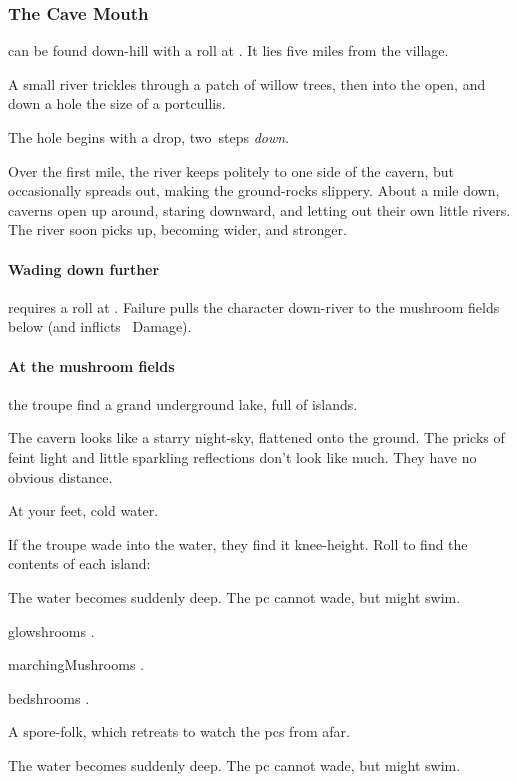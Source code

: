 \documentclass[10pt,twoside]{book}
\begin{document}
\subsubsection{The Cave Mouth}\label{caveMouth}
can be found down-hill with a  roll at \tn[12].
It lies five miles from the \gls{village}.

\begin{boxtext}
  A small river trickles through a patch of willow trees, then into the open, and down a hole the size of a portcullis.
\end{boxtext}

The hole begins with a drop, two~\glspl{step} \emph{down}.%

\begin{boxtext}
  Over the first mile, the river keeps politely to one side of the cavern, but occasionally spreads out, making the ground-rocks slippery.
  About a mile down, caverns open up around, staring downward, and letting out their own little rivers.
  The river soon picks up, becoming wider, and stronger.
\end{boxtext}

\paragraph{Wading down further}
requires a  roll at \tn[8].
Failure pulls the character down-river to the mushroom fields below (and inflicts ~Damage).

\paragraph{At the mushroom fields}
the troupe find a grand underground lake, full of islands.


\begin{boxtext}
  The cavern looks like a starry night-sky, flattened onto the ground.
  The pricks of feint light and little sparkling reflections don't look like much.
  They have no obvious distance.

  At your feet, cold water.
\end{boxtext}

If the troupe wade into the water, they find it knee-height.
Roll to find the contents of each island:

{
  \footnotesize
  \begin{dlist}
    \item
    The water becomes suddenly deep.
    The \gls{pc} cannot wade, but might swim.
    \item
    \Glspl{glowshroom} .
    \item
    \Glspl{marchingMushroom} .
    \item
    \Glspl{bedshroom} .
    \item
    A spore-folk, which retreats to watch the \glspl{pc} from afar.
    \item
    The water becomes suddenly deep.
    The \gls{pc} cannot wade, but might swim.
  \end{dlist}
}
\end{document}
